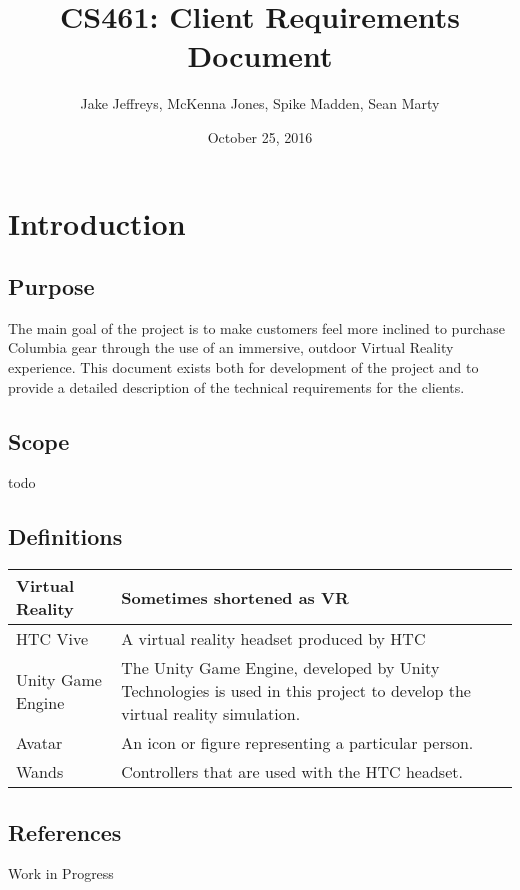 \documentclass[10pt,journal,compsoc,onecolumn]{IEEEtran}
\title{CS461: Client Requirements Document}
\author{Jake Jeffreys, McKenna Jones, Spike Madden, Sean Marty}
\date{October 25, 2016}
\begin{document}
\begin{titlepage}
\maketitle
\vspace{3cm}

\end{titlepage}

\tableofcontents

\section{Introduction}

\subsection{Purpose}
The main goal of the project is to make customers feel more inclined to purchase
Columbia gear through the use of an immersive, outdoor Virtual Reality
experience. This document exists both for development of the project and to provide a detailed description of the technical requirements for the clients.

\subsection{Scope}
todo

\subsection{Definitions}
\begin{center}
	\begin{tabular}{| m{3cm} | m{9cm} |}
		\hline
		Virtual Reality & Sometimes shortened as VR \\
		\hline
		HTC Vive & A virtual reality headset produced by HTC \\
		\hline
		Unity Game Engine & The Unity Game Engine, developed by Unity Technologies
    is used in this project to develop the virtual reality simulation. \\
    \hline
    Avatar & An icon or figure representing a particular person. \\
    \hline
    Wands & Controllers that are used with the HTC headset. \\
    \hline
		\end{tabular}
\end{center}

\subsection{References}
Work in Progress
\end{document}

